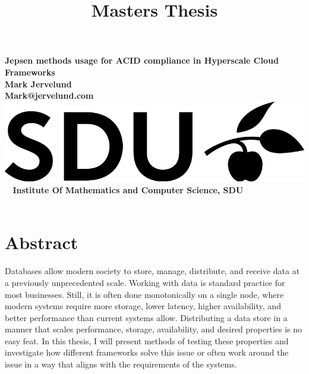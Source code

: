 \documentclass[a4paper,10pt,titlepage]{report}
\date{}
\title{Masters Thesis}
\begin{document}
    \begin{titlepage}
        \centering
        \vspace*{9\baselineskip}
        \huge
        \bfseries
        Jepsen methods usage for ACID compliance in Hyperscale Cloud Frameworks \\
        \normalfont
        Mark Jervelund \\
        Mark@jervelund.com \\
        \vspace*{9\baselineskip}
        \normalfont
        \includegraphics[scale=1]{logos/SDU_BLACK.png}
        \vfill\
        \vspace{5mm}
        Institute Of Mathematics and Computer Science, SDU \\

        \textbf{\datedate} \\[2\baselineskip]
    \end{titlepage}

    \renewcommand{\thepage}{\roman{page}}%
    \tableofcontents
    \newpage
    \setcounter{page}{1}
    \renewcommand{\thepage}{\arabic{page}}


    \section*{Abstract}
    Databases allow modern society to store, manage, distribute, and receive data at a previously unprecedented scale. Working with data is standard practice for most businesses. Still, it is often done monotonically on a single node, where modern systems require more storage, lower latency, higher availability, and better performance than current systems allow. Distributing a data store in a manner that scales performance, storage, availability, and desired properties is no easy feat. In this thesis, I will present methods of testing these properties and investigate how different frameworks solve this issue or often work around the issue in a way that aligns with the requirements of the systems. \\
    \vspace{5mm}
\end{document}
